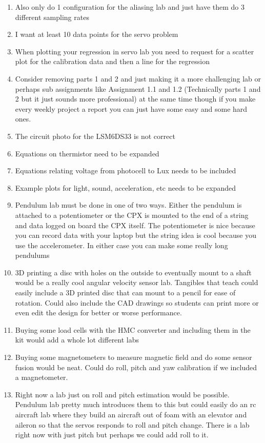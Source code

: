 \begin{enumerate}[itemsep=-5pt]
\item Also only do 1 configuration for the aliasing lab and just have them do 3 different sampling rates
\item I want at least 10 data points for the servo problem
\item When plotting your regression in servo lab you need to request for a scatter plot for the calibration data and then a line for the regression
\item Consider removing parts 1 and 2 and just making it a more challenging lab or perhaps sub assignments like Assignment 1.1 and 1.2 (Technically parts 1 and 2 but it just sounds more professional) at the same time though if you make every weekly project a report you can just have some easy and some hard ones.
\item The circuit photo for the LSM6DS33 is not correct
\item Equations on thermistor need to be expanded
\item Equations relating voltage from photocell to Lux needs to be included
\item Example plots for light, sound, acceleration, etc needs to be expanded
\item Pendulum lab must be done in one of two ways. Either the pendulum is attached to a potentiometer or the CPX is mounted to the end of a string and data logged on board the CPX itself. The potentiometer is nice because you can record data with your laptop but the string idea is cool because you use the accelerometer. In either case you can make some really long pendulums
\item 3D printing a disc with holes on the outside to eventually mount to a shaft would be a really cool angular velocity sensor lab. Tangibles that teach could easily include a 3D printed disc that can mount to a pencil for ease of rotation. Could also include the CAD drawings so students can print more or even edit the design for better or worse performance.
\item Buying some load cells with the HMC converter and including them in the kit would add a whole lot different labs
\item Buying some magnetometers to measure magnetic field and do some sensor fusion would be neat. Could do roll, pitch and yaw calibration if we included a magnetometer.
\item Right now a lab just on roll and pitch estimation would be possible. Pendulum lab pretty much introduces them to this but could easily do an rc aircraft lab where they build an aircraft out of foam with an elevator and aileron so that the servos responds to roll and pitch change. There is a lab right now with just pitch but perhaps we could add roll to it.

\end{enumerate}
